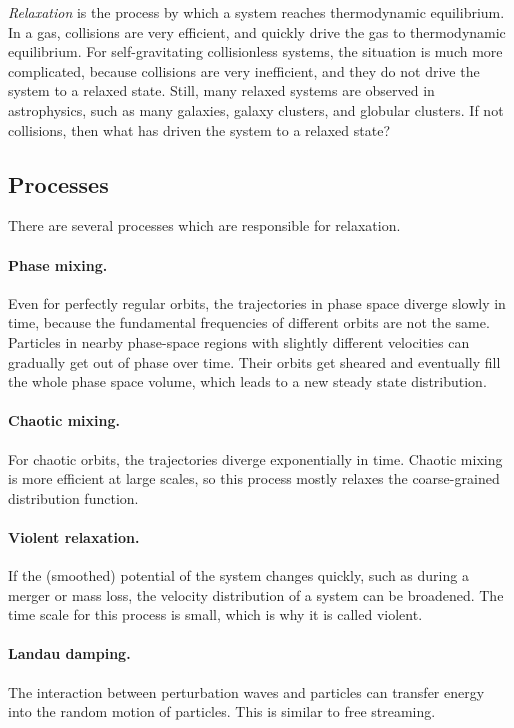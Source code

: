 \emph{Relaxation} is the process by which a system reaches thermodynamic equilibrium. In a gas, collisions are very efficient, and quickly drive the gas to thermodynamic equilibrium.
For self-gravitating collisionless systems, the situation is much more complicated, because collisions are very inefficient, and they do not drive the system to a relaxed state.
Still, many relaxed systems are observed in astrophysics, such as many galaxies, galaxy clusters, and globular clusters.
If not collisions, then what has driven the system to a relaxed state?

\subsection{Processes}

There are several processes which are responsible for relaxation.

\paragraph{Phase mixing.}
Even for perfectly regular orbits, the trajectories in phase space diverge slowly in time, because the fundamental frequencies of different orbits are not the same.
Particles in nearby phase-space regions with slightly different velocities can gradually get out of phase over time.
Their orbits get sheared and eventually fill the whole phase space volume, which leads to a new steady state distribution.

\paragraph{Chaotic mixing.}
For chaotic orbits, the trajectories diverge exponentially in time.
Chaotic mixing is more efficient at large scales, so this process mostly relaxes the coarse-grained distribution function.

\paragraph{Violent relaxation.}
If the (smoothed) potential of the system changes quickly, such as during a merger or mass loss, the velocity distribution of a system can be broadened.
The time scale for this process is small, which is why it is called violent.

\paragraph{Landau damping.}
The interaction between perturbation waves and particles can transfer energy into the random motion of particles. This is similar to free streaming.



